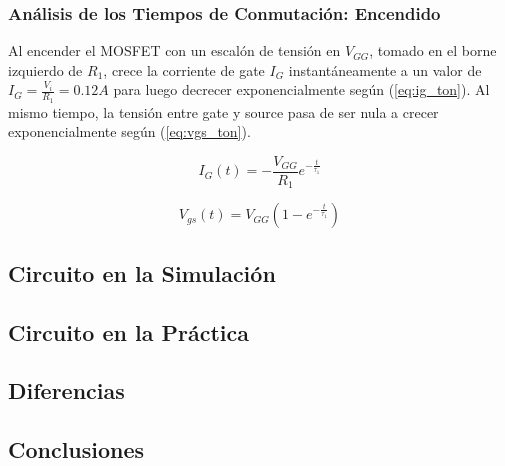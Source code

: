 \subsubsection{Análisis de los Tiempos de Conmutación: Encendido}

Al encender el MOSFET con un escalón de tensión en $V_{GG}$, tomado en el borne izquierdo de $R_1$, crece la corriente de gate $I_G$ instantáneamente a un valor de $I_G = \frac{V_i}{R_1} = 0.12A$ para luego decrecer exponencialmente según (\ref{eq:ig_ton}). Al mismo tiempo, la tensión entre gate y source pasa de ser nula a crecer exponencialmente según (\ref{eq:vgs_ton}).

\begin{equation}
I_G(t) = -\frac{V_{GG}}{R_1}e^{-\frac{t}{\tau_1}}
\label{eq:ig_ton}
\end{equation}

\begin{equation}
V_{gs}(t) = V_{GG}(1-e^{-\frac{t}{\tau_1}})
\label{eq:vgs_ton}
\end{equation}

\subsection{Circuito en la Simulación}

\subsection{Circuito en la Práctica}

\subsection{Diferencias}

\subsection{Conclusiones}

